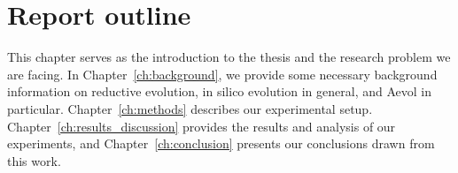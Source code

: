 \section{Report outline}
This chapter serves as the introduction to the thesis and the research problem we are facing. In Chapter~\ref{ch:background}, we provide some necessary background information on reductive evolution, in silico evolution in general, and Aevol in particular. Chapter~\ref{ch:methods} describes our experimental setup. Chapter~\ref{ch:results_discussion}
provides the results and analysis of our experiments, and Chapter~\ref{ch:conclusion} presents our conclusions drawn from this work. 


